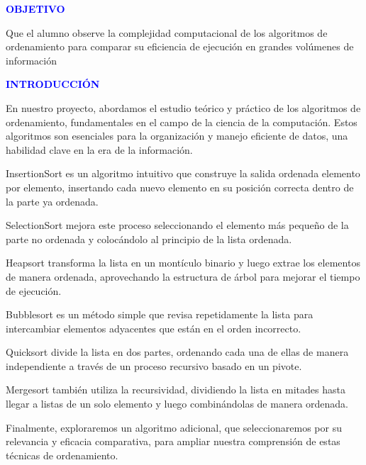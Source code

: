 \documentclass[12pt]{article}
\begin{document}
\newpage
\textcolor{blue}{\textbf{OBJETIVO}}
\par\vspace{0.4cm}
Que el alumno observe la complejidad computacional de los algoritmos de ordenamiento para
comparar su eficiencia de ejecución en grandes volúmenes de información
\par\vspace{1.5cm}
\textcolor{blue}{\textbf{INTRODUCCIÓN}}
\par\vspace{0.4cm}
En nuestro proyecto, abordamos el estudio teórico y práctico de los algoritmos de ordenamiento, fundamentales en el campo de la ciencia de la computación. Estos algoritmos son esenciales para la organización y manejo eficiente de datos, una habilidad clave en la era de la información.
\par\vspace{0.4cm}
InsertionSort es un algoritmo intuitivo que construye la salida ordenada elemento por elemento, insertando cada nuevo elemento en su posición correcta dentro de la parte ya ordenada.
\par\vspace{0.4cm}
SelectionSort mejora este proceso seleccionando el elemento más pequeño de la parte no ordenada y colocándolo al principio de la lista ordenada.
\par\vspace{0.4cm}
Heapsort transforma la lista en un montículo binario y luego extrae los elementos de manera ordenada, aprovechando la estructura de árbol para mejorar el tiempo de ejecución.
\par\vspace{0.4cm}
Bubblesort es un método simple que revisa repetidamente la lista para intercambiar elementos adyacentes que están en el orden incorrecto.
\par\vspace{0.4cm}
Quicksort divide la lista en dos partes, ordenando cada una de ellas de manera independiente a través de un proceso recursivo basado en un pivote.
\par\vspace{0.4cm}
Mergesort también utiliza la recursividad, dividiendo la lista en mitades hasta llegar a listas de un solo elemento y luego combinándolas de manera ordenada.
\par\vspace{0.4cm}
Finalmente, exploraremos un algoritmo adicional, que seleccionaremos por su relevancia y eficacia comparativa, para ampliar nuestra comprensión de estas técnicas de ordenamiento.
\end{document}
